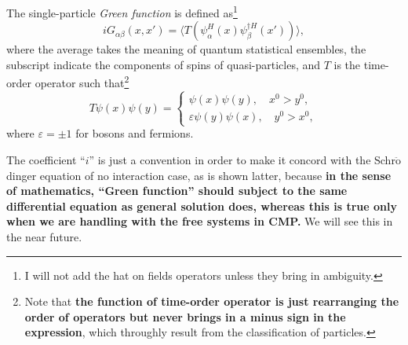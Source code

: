 \documentclass[b5paper,10pt,UTF8]{book}
\numberwithin{equation}{section}
\begin{document}
		\begin{Def}
			The single-particle \emph{Green function} is defined as\footnote{I will not add the hat on fields operators unless they bring in ambiguity.}
			\begin{equation}\label{2.2.1}
				iG_{\alpha\beta}(x,x')=\langle T(\psi_\alpha^H(x)\psi^{\dagger H}_\beta(x'))\rangle,
			\end{equation}
			where the average takes the meaning of quantum statistical ensembles, the subscript indicate the components of spins of quasi-particles, and $T$ is the time-order operator such that\footnote{Note that \textbf{the function of time-order operator is just rearranging the order of operators but never brings in a minus sign in the expression}, which throughly result from the classification of particles.}
			$$T\psi(x)\psi(y)=\begin{cases}\psi(x)\psi(y),\quad x^0>y^0,\\\varepsilon\psi(y)\psi(x),\quad y^0>x^0,\end{cases}$$
			where $\varepsilon=\pm1$ for bosons and fermions.
		\end{Def}
		\begin{Note}
			The coefficient ``$i$'' is just a convention in order to make it concord with the Schr$\ddot{\text{o}}$dinger equation of no interaction case, as is shown latter, because \textbf{in the sense of mathematics, ``Green function'' should subject to the same differential equation as general solution does, whereas this is true only when we are handling with the free systems in CMP.} We will see this in the near future.
		\end{Note}
\end{document}
